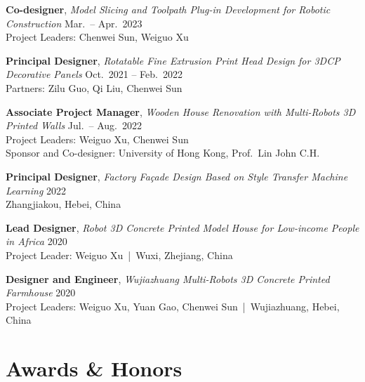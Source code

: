 \documentclass[11pt,a4paper]{article}
\newcommand{\entrytitle}[1]{\textbf{#1}}
\newcommand{\entrydetail}[1]{\textit{#1}}
\begin{document}
\entrytitle{Co-designer}, \entrydetail{Model Slicing and Toolpath Plug-in Development for Robotic Construction} \hfill Mar.\ -- Apr.\ 2023 \\
Project Leaders: Chenwei Sun, Weiguo Xu

\entrytitle{Principal Designer}, \entrydetail{Rotatable Fine Extrusion Print Head Design for 3DCP Decorative Panels} \hfill Oct.\ 2021 -- Feb.\ 2022 \\
Partners: Zilu Guo, Qi Liu, Chenwei Sun

\entrytitle{Associate Project Manager}, \entrydetail{Wooden House Renovation with Multi-Robots 3D Printed Walls} \hfill Jul.\ -- Aug.\ 2022 \\
Project Leaders: Weiguo Xu, Chenwei Sun \\
Sponsor and Co-designer: University of Hong Kong, Prof.\ Lin John C.H.

\entrytitle{Principal Designer}, \entrydetail{Factory Fa\c{c}ade Design Based on Style Transfer Machine Learning} \hfill 2022 \\
Zhangjiakou, Hebei, China

\entrytitle{Lead Designer}, \entrydetail{Robot 3D Concrete Printed Model House for Low-income People in Africa} \hfill 2020 \\
Project Leader: Weiguo Xu \,|\, Wuxi, Zhejiang, China

\entrytitle{Designer and Engineer}, \entrydetail{Wujiazhuang Multi-Robots 3D Concrete Printed Farmhouse} \hfill 2020 \\
Project Leaders: Weiguo Xu, Yuan Gao, Chenwei Sun \,|\, Wujiazhuang, Hebei, China

\section{Awards \& Honors}
\end{document}
